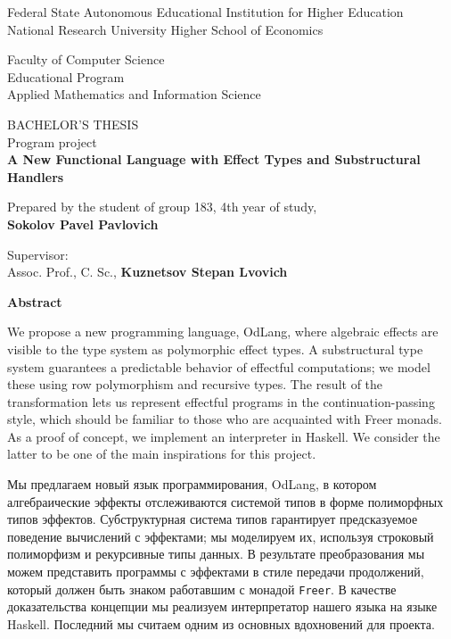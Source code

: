 \documentclass[a4paper,14pt]{extreport}
\begin{document}
\begin{titlepage}
\begin{center}
    Federal State Autonomous Educational Institution for Higher Education \\
    National Research University Higher School of Economics

    \vspace{1cm}
    Faculty of Computer Science \\
    Educational Program \\
    Applied Mathematics and Information Science

    \vspace{3cm}
    BACHELOR'S THESIS \\
    Program project \\
    \textbf{A New Functional Language with Effect Types
    and Substructural Handlers}
\end{center}
\vspace{1cm}
Prepared by the student of group 183, 4th year of study, \\
\textbf{Sokolov Pavel Pavlovich}

\vspace{0.5cm}
\noindent Supervisor: \hfill \\
Assoc. Prof., C. Sc., \textbf{Kuznetsov Stepan Lvovich}

\vfill
{}
\end{titlepage}

\tableofcontents

\newpage

\begin{center}\textbf{Abstract}\end{center}

We propose a new programming language, OdLang, where algebraic effects are
visible to the type system as polymorphic effect types. A substructural type
system guarantees a predictable behavior of effectful computations; we model
these using row polymorphism and recursive types. The result of the
transformation lets us represent effectful programs in the continuation-passing
style, which should be familiar to those who are acquainted with Freer monads.
As a proof of concept, we implement an interpreter in Haskell. We consider the
latter to be one of the main inspirations for this project.

Мы предлагаем новый язык программирования, OdLang, в котором алгебраические
эффекты отслеживаются системой типов в форме поли\-морфных типов эффектов.
Субструктурная система типов гарантирует предсказуемое поведение вычислений с
эффектами; мы моделируем их, используя строковый полиморфизм и рекурсивные типы
данных. В ре\-зультате преобразования мы можем представить программы с эффектами
в стиле передачи продолжений, который должен быть знаком работавшим с монадой
\verb|Freer|. В качестве доказательства концепции мы реализуем интерпретатор
нашего языка на языке Haskell. Последний мы считаем одним из основных
вдохновений для проекта.
\end{document}

